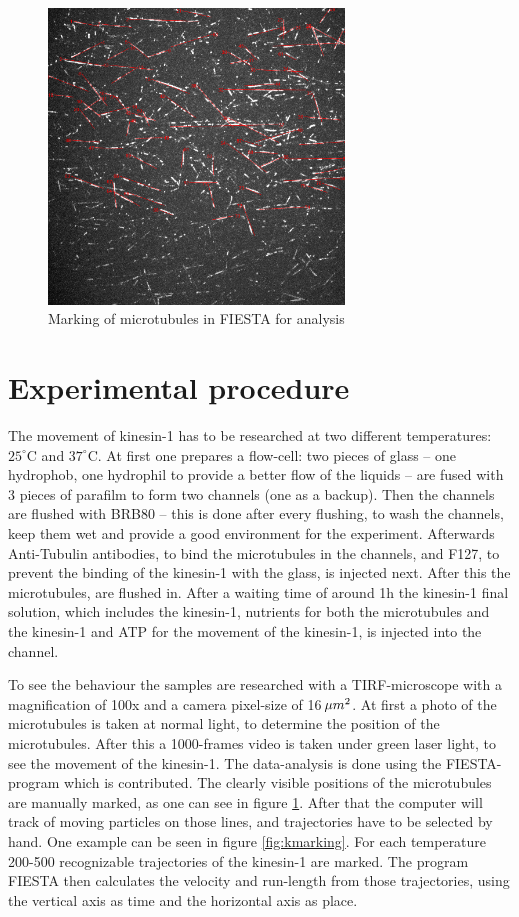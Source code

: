 \documentclass[english, %
parskip=full, %
bibliography=totoc, %
]{scrartcl}
\begin{document}
\begin{figure}[!ht] 
  \centering
     \includegraphics[width=0.7\textwidth]{kinesin_marking}
  \caption{Marking of microtubules in FIESTA for analysis}
  \label{fig:marking}
\end{figure}

\section{Experimental procedure}

The movement of kinesin-1 has to be researched at two different temperatures: $25^\circ\text{C}$ and $37^\circ\text{C}$.
At first one prepares a flow-cell: two pieces of glass – one hydrophob, one hydrophil to provide a better flow of the liquids – are fused with 3 pieces of parafilm to form two channels (one as a backup). Then the channels are flushed with BRB80 – this is done after every flushing, to wash the channels, keep them wet and provide a good environment for the experiment. Afterwards Anti-Tubulin antibodies, to bind the microtubules in the channels, and F127, to prevent the binding of the kinesin-1 with the glass, is injected next. After this the microtubules, are flushed in. After a waiting time of around 1h the kinesin-1 final solution, which includes the kinesin-1, nutrients for both the microtubules and the kinesin-1 and ATP for the movement of the kinesin-1, is injected into the channel.

To see the behaviour the samples are researched with a TIRF-microscope with a magnification of 100x and a camera pixel-size of 16\,$\mu m\textsuperscript{2}$. At first a photo of the microtubules is taken at normal light, to determine the position of the microtubules. After this a 1000-frames video is taken under green laser light, to see the movement of the kinesin-1. The data-analysis is done using the FIESTA-program which is contributed. The clearly visible positions of the microtubules are manually marked, as one can see in figure \ref{fig:marking}. After that the computer will track of moving particles on those lines, and trajectories have to be selected by hand. One example can be seen in figure \ref{fig:kmarking}. For each temperature 200-500 recognizable trajectories of the kinesin-1 are marked. The program FIESTA then calculates the velocity and run-length from those trajectories, using the vertical axis as time and the horizontal axis as place.
\end{document}

